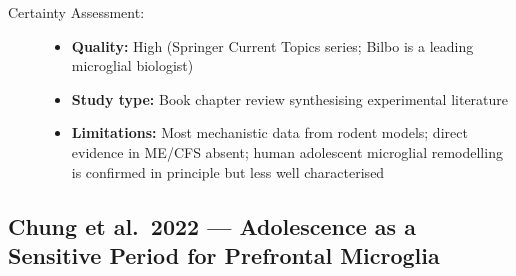 \begin{description}
    \item[Certainty Assessment:]
    \begin{itemize}
        \item \textbf{Quality:} High (Springer Current Topics series; Bilbo is a leading microglial biologist)
        \item \textbf{Study type:} Book chapter review synthesising experimental literature
        \item \textbf{Limitations:} Most mechanistic data from rodent models; direct evidence in ME/CFS absent; human adolescent microglial remodelling is confirmed in principle but less well characterised
    \end{itemize}
\end{description}

\subsection{Chung et al.\ 2022 --- Adolescence as a Sensitive Period for Prefrontal Microglia}


